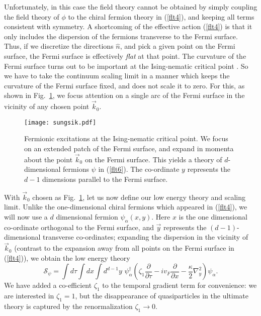 \documentclass[10pt, oneside]{book}
\begin{document}
\begin{doublespace}
Unfortunately, in this case the field theory cannot be obtained by simply coupling the field theory of $\phi$
to the chiral fermion theory in (\ref{flt4}), and keeping all terms consistent with symmetry.
A shortcoming of the effective action (\ref{flt4}) is that it only includes the dispersion of the fermions
transverse to the Fermi surface. Thus, if we discretize the directions $\hat{n}$, and pick a given point on 
the Fermi surface, the Fermi surface is effectively {\em flat\/} at that point. 
The curvature of the Fermi surface turns out to be important at the Ising-nematic critical point \cite{sungsik1}.
So we have to take the continuum scaling limit in a manner which keeps the curvature
of the Fermi surface fixed, and does not scale it to zero. For this, as shown in Fig.~\ref{fig:sungsik},
we focus attention on a single arc of the Fermi surface in the vicinity of any chosen point
$\vec{k}_0$. 
\begin{figure}
\centerline{\texttt{[image: sungsik.pdf]}} 
\caption{Fermionic excitations at the Ising-nematic critical point. We focus on an extended patch of the
Fermi surface, and expand in momenta about the point $\vec{k}_0$ on the Fermi surface. 
This yields a theory of $d$-dimensional fermions $\psi$ in (\ref{flt6}).
The co-ordinate $y$ represents the $d-1$ dimensions parallel to the Fermi surface.} \label{fig:sungsik}
\end{figure}
With $\vec{k}_0$ chosen as Fig.~\ref{fig:sungsik}, let us now define our low energy theory and scaling limit.
Unlike the one-dimensional chiral fermions which appeared in (\ref{flt4}), we will now use a $d$ dimensional
fermion $\psi_{\alpha} (x, y)$. Here $x$ is the one dimensional co-ordinate orthogonal to the Fermi surface,
and $\vec{y}$ represents the $(d-1)$-dimensional transverse co-ordinates; expanding the dispersion in the vicinity of $\vec{k}_0$ (contrast to the expansion away
from all points on the Fermi surface in (\ref{flt4})), we obtain the low energy theory \cite{sungsik1}
\begin{equation}
\mathcal{S}_\psi = \int \! d \tau \int \! dx \int \! d^{d-1} y \, \,  \psi_{\alpha}^\dagger \left(  \zeta_1 \frac{\partial}{\partial \tau} - i v_F \frac{\partial}{\partial x}
- \frac{\kappa}{2} \nabla_y^2 \right) \psi_{\alpha} . \label{flt6}
\end{equation}
We have added a co-efficient $\zeta_1$ to the temporal gradient term for convenience: we are interested in $\zeta_1=1$,
but the disappearance of quasiparticles in the ultimate theory is captured by the renormalization $\zeta_1 \rightarrow 0$.

\end{doublespace}
\end{document}
